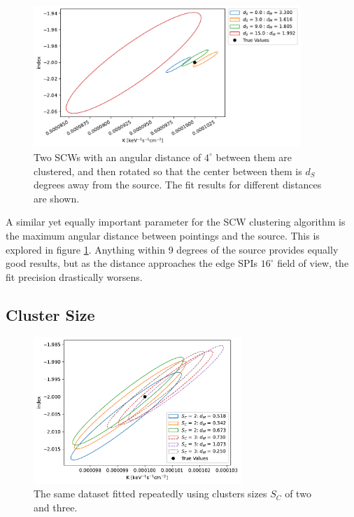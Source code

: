 \documentclass{report}
\begin{document}
\begin{figure}[H]
  \centering
  \includegraphics[width=0.9\textwidth]{Images/Pure_Simulation/combined_plot_source_distances.pdf}
  \caption{Two SCWs with an angular distance of $4^\circ$ between them are clustered, and then rotated so that the center between them is $d_S$ degrees away from the source. The fit results for different distances are shown.}
  \label{fig source distance}
\end{figure}

A similar yet equally important parameter for the SCW clustering algorithm is the maximum angular distance between pointings and the source. This is explored in figure \ref{fig source distance}. Anything within 9 degrees of the source provides equally good results, but as the distance approaches the edge SPIs $16^\circ$ field of view, the fit precision drastically worsens. 

\FloatBarrier


\subsection{Cluster Size}

\begin{figure}[h]
  \centering
  \includegraphics[width=0.7\textwidth]{Images/Pure_Simulation/combined_plots_cluster_size.pdf}
  \caption{The same dataset fitted repeatedly using clusters sizes $S_C$ of two and three.}
  \label{fig cluster size}
\end{figure}
\end{document}
